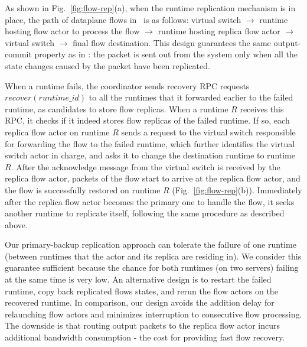 As shown in Fig.~\ref{fig:flow-rep}(a), when the runtime replication mechanism is in place, the path of dataplane flows in \nfactor~is as follows: virtual switch $\rightarrow$ runtime hosting flow actor to process the flow $\rightarrow$ runtime hosting replica flow actor $\rightarrow$ virtual switch $\rightarrow$ final flow destination. This design guarantees the same output-commit property as in \cite{sherry2015rollback}: the packet is sent out from the system only when all the state changes caused by the packet have been replicated. %



When a runtime fails, the coordinator sends recovery RPC requests $recover(runtime\_id) $ to all the runtimes that it forwarded earlier to the failed runtime, as candidates to store flow replicas. When a runtime $R$ receives this RPC, it checks if it indeed stores flow replicas of the failed runtime. If so, each replica flow actor on runtime $R$ sends a request to the virtual switch responsible for forwarding the flow to the failed runtime, which further identifies the virtual switch actor in charge, and asks it to change the destination runtime to runtime $R$. After the acknowledge message from the virtual switch is received by the replica flow actor, packets of the flow start to arrive at the replica flow actor, and the flow is successfully restored on runtime $R$ (Fig.~\ref{fig:flow-rep}(b)). Immediately after the replica flow actor becomes the primary one to handle the flow, it seeks another runtime to replicate itself, following the same procedure as described above.


Our primary-backup replication approach can tolerate the failure of one runtime (between runtimes that the actor and its replica are residing in). We consider this guarantee sufficient because the
chance for both runtimes (on two servers) failing at the same time is very low. An alternative design is to restart the failed runtime, copy back replicated flows states, and rerun the flow actors on the recovered runtime. In comparison, our design avoids the addition delay for relaunching flow actors and minimizes interruption to consecutive flow processing. %
 The downside is that routing output packets to the replica flow actor incurs additional bandwidth consumption -  the cost for providing fast flow recovery. %


